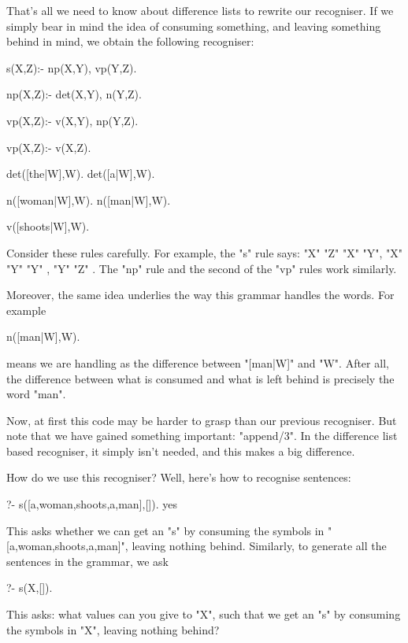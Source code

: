 That's all we need to know about difference lists to rewrite our
recogniser. If we simply bear in mind the idea of consuming something,
and leaving something behind in mind, we obtain the following
recogniser:
\begin{LPNcodedisplay}
s(X,Z):- np(X,Y), vp(Y,Z).

np(X,Z):- det(X,Y), n(Y,Z).

vp(X,Z):-  v(X,Y), np(Y,Z).

vp(X,Z):-  v(X,Z).

det([the|W],W).
det([a|W],W).

n([woman|W],W).
n([man|W],W).

v([shoots|W],W).
\end{LPNcodedisplay}

Consider these rules carefully. For example, the "s" rule says:
 "X"  "Z"
 "X"  "Y",  "X"  "Y"
 "Y" ,  "Y"
"Z" . The  "np" rule and the
second of the "vp" rules work similarly.

Moreover, the same idea underlies the way this grammar handles the
words. For example
\begin{LPNcodedisplay}
n([man|W],W).
\end{LPNcodedisplay}
means we are handling  as the difference between
"[man|W]" and "W".  After all, the difference between what is consumed
and what is left behind is precisely the word "man".

Now, at first this code may be harder to grasp than our previous
recogniser. But note that we have gained something important:
 "append/3". In the difference list based
recogniser, it simply isn't needed, and this makes a big difference.

How do we use this recogniser? Well, here's how to recognise
sentences:
\begin{LPNcodedisplay}
?- s([a,woman,shoots,a,man],[]).
yes
\end{LPNcodedisplay}
This asks whether we can get an "s" by consuming the symbols
in "[a,woman,shoots,a,man]", leaving nothing behind.
Similarly, to generate all the sentences in the grammar,
we ask
\begin{LPNcodedisplay}
?- s(X,[]).
\end{LPNcodedisplay}
This asks: what values can you give to "X", such that we get an "s" by
consuming the symbols in "X", leaving nothing behind?

